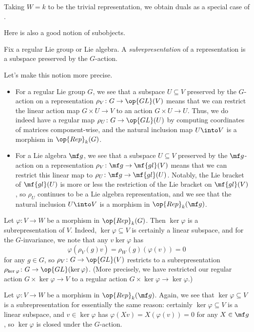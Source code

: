 \documentclass[../notes.tex]{subfiles}
\begin{document}
\begin{example}
	Taking $W=k$ to be the trivial representation, we obtain duals as a special case of .
\end{example}
Here is also a good notion of subobjects.
\begin{definition}[suprepresentation]
	Fix a regular Lie group or Lie algebra. A \textit{subrepresentation} of a representation is a subspace preserved by the $G$-action.
\end{definition}
\begin{remark}
	Let's make this notion more precise.
	\begin{itemize}
		\item For a regular Lie group $G$, we see that a subspace $U\subseteq V$ preserved by the $G$-action on a representation $\rho_V\colon G\to\op{GL}(V)$ means that we can restrict the linear action map $G\times U\to V$ to an action $G\times U\to U$. Thus, we do indeed have a regular map $\rho_U\colon G\to\op{GL}(U)$ by computing coordinates of matrices component-wise, and the natural inclusion map $U\into V$ is a morphism in $\op{Rep}_k(G)$.
		\item For a Lie algebra $\mf g$, we see that a subspace $U\subseteq V$ preserved by the $\mf g$-action on a representation $\rho_V\colon\mf g\to\mf{gl}(V)$ means that we can restrict this linear map to $\rho_U\colon\mf g\to\mf{gl}(U)$. Notably, the Lie bracket of $\mf{gl}(U)$ is more or less the restriction of the Lie bracket on $\mf{gl}(V)$, so $\rho_U$ continues to be a Lie algebra representation, and we see that the natural inclusion $U\into V$ is a morphism in $\op{Rep}_k(\mf g)$.
	\end{itemize}
\end{remark}
\begin{example} \label{ex:ker-subrep-grp}
	Let $\varphi\colon V\to W$ be a morphism in $\op{Rep}_k(G)$. Then $\ker\varphi$ is a subrepresentation of $V$. Indeed, $\ker\varphi\subseteq V$ is certainly a linear subspace, and for the $G$-invariance, we note that any $v\ker\varphi$ has
	\[\varphi(\rho_V(g)v)=\rho_W(g)(\varphi(v))=0\]
	for any $g\in G$, so $\rho_V\colon G\to\op{GL}(V)$ restricts to a subrepresentation $\rho_{\ker\varphi}\colon G\to\op{GL}(\ker\varphi)$. (More precisely, we have restricted our regular action $G\times\ker\varphi\to V$ to a regular action $G\times\ker\varphi\to\ker\varphi$.)
\end{example}
\begin{example} \label{ex:ker-subrep-alg}
	Let $\varphi\colon V\to W$ be a morphism in $\op{Rep}_k(\mf g)$. Again, we see that $\ker\varphi\subseteq V$ is a subrepresentation for essentially the same reason: certainly $\ker\varphi\subseteq V$ is a linear subspace, and $v\in\ker\varphi$ has $\varphi(Xv)=X(\varphi(v))=0$ for any $X\in\mf g$, so $\ker\varphi$ is closed under the $G$-action.
\end{example}
\end{document}
